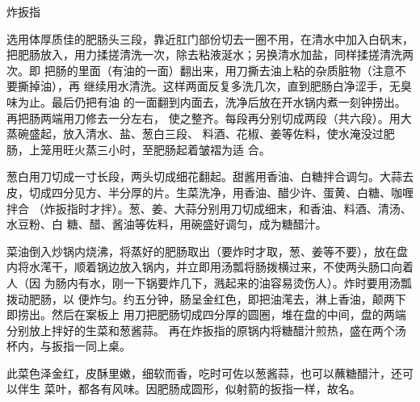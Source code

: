 \begin{recipe}{炸扳指}

\ingredients


\preparation

\step 选用体厚质佳的肥肠头三段，靠近肛门部份切去一圈不用，在清水中加入白矾末，
把肥肠放入，用力揉搓清洗一次，除去粘液涎水；另换清水加盐，同样揉搓清洗两次。即
把肠的里面（有油的一面）翻出来，用刀撕去油上粘的杂质脏物（注意不要撕掉油），再
继续用水清洗。这样两面反复多洗几次，直到肥肠白净涩手，无臭味为止。最后仍把有油
的一面翻到内面去，洗净后放在开水锅内煮一刻钟捞出。再把肠两端用刀修去一分左右，
使之整齐。每段再分别切成两段（共六段）。用大蒸碗盛起，放入清水、盐、葱白三段、
料酒、花椒、姜等佐料，使水淹没过肥肠，上笼用旺火蒸三小时，至肥肠起着皱褶为适
合。

\step 葱白用刀切成一寸长段，两头切成细花翻起。甜酱用香油、白糖拌合调匀。大蒜去
皮，切成四分见方、半分厚的片。生菜洗净，用香油、醋少许、蛋黄、白糖、咖喱拌合
（炸扳指时才拌）。葱、姜、大蒜分别用刀切成细末，和香油、料酒、清汤、水豆粉、白
糖、醋、酱油等佐料，用碗盛好调匀，成为糖醋汁。

\step 菜油倒入炒锅内烧沸，将蒸好的肥肠取出（要炸时才取，葱、姜等不要），放在盘
内将水滗干，顺着锅边放入锅内，并立即用汤瓢将肠拨横过来，不使两头肠口向着人（因
为肠内有水，刚一下锅要炸几下，溅起来的油容易烫伤人）。炸时要用汤瓢拨动肥肠，以
便炸匀。约五分钟，肠呈金红色，即把油滗去，淋上香油，颠两下即捞出。然后在案板上
用刀把肥肠切成四分厚的圆圈，堆在盘的中间，盘的两端分别放上拌好的生菜和葱酱蒜。
再在炸扳指的原锅内将糖醋汁煎热，盛在两个汤杯内，与扳指一同上桌。

\features

此菜色泽金红，皮酥里嫩，细软而香，吃时可佐以葱酱蒜，也可以蘸糖醋汁，还可以伴生
菜叶，都各有风味。因肥肠成圆形，似射箭的扳指一样，故名。

\end{recipe}


